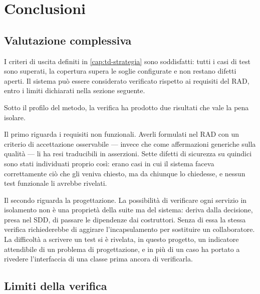\chapter{Conclusioni}
\label{cap:td-conclusioni}

\section{Valutazione complessiva}

I criteri di uscita definiti in \cref{cap:td-strategia} sono soddisfatti:
tutti i casi di test sono superati, la copertura supera le soglie
configurate e non restano difetti aperti. Il sistema può essere considerato
verificato rispetto ai requisiti del RAD, entro i limiti dichiarati nella
sezione seguente.

Sotto il profilo del metodo, la verifica ha prodotto due risultati che vale
la pena isolare.

Il primo riguarda i requisiti non funzionali. Averli formulati nel RAD con un
criterio di accettazione osservabile — invece che come affermazioni generiche
sulla qualità — li ha resi traducibili in asserzioni. Sette difetti di
sicurezza su quindici sono stati individuati proprio così: erano casi in cui
il sistema faceva correttamente ciò che gli veniva chiesto, ma da chiunque lo
chiedesse, e nessun test funzionale li avrebbe rivelati.

Il secondo riguarda la progettazione. La possibilità di verificare ogni
servizio in isolamento non è una proprietà della suite ma del sistema: deriva
dalla decisione, presa nel SDD, di passare le dipendenze dai costruttori.
Senza di essa la stessa verifica richiederebbe di aggirare l'incapsulamento
per sostituire un collaboratore. La difficoltà a scrivere un test si è
rivelata, in questo progetto, un indicatore attendibile di un problema di
progettazione, e in più di un caso ha portato a rivedere l'interfaccia di una
classe prima ancora di verificarla.

\section{Limiti della verifica}
\label{sec:td-limiti}

